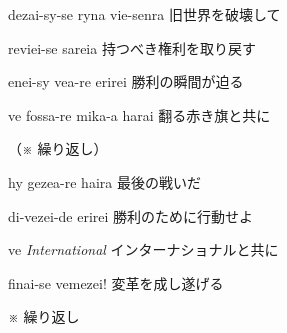 \lyric
{dezai-sy-se ryna vie-senra}
{旧世界を破壊して}

\lyric
{reviei-se sareia}
{持つべき権利を取り戻す}

\lyric
{enei-sy vea-re erirei}
{勝利の瞬間が迫る}

\lyric
{ve fossa-re mika-a harai}
{翻る赤き旗と共に}

（※ 繰り返し）

\lyric
{hy gezea-re haira}
{最後の戦いだ}

\lyric
{di-vezei-de erirei}
{勝利のために行動せよ}

\lyric
{ve \emph{International}}
{インターナショナルと共に}

\lyric
{finai-se vemezei!}
{変革を成し遂げる}

※ 繰り返し

